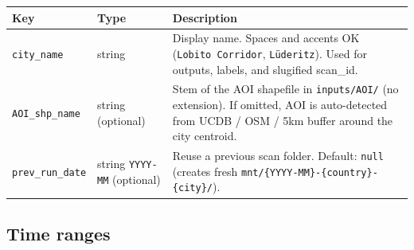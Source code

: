 \documentclass[
  letterpaper,
  DIV=11,
  numbers=noendperiod]{scrreprt}
\newcounter{none} %
\begin{document}
{\def\LTcaptype{none} %
\begin{longtable}[]{@{}
  >{\raggedright\arraybackslash}p{}
  >{\raggedright\arraybackslash}p{}
  >{\raggedright\arraybackslash}p{}@{}}
\toprule\noalign{}
\begin{minipage}[b]{\linewidth}\raggedright
Key
\end{minipage} & \begin{minipage}[b]{\linewidth}\raggedright
Type
\end{minipage} & \begin{minipage}[b]{\linewidth}\raggedright
Description
\end{minipage} \\
\midrule\noalign{}
\endhead
\bottomrule\noalign{}
\endlastfoot
\texttt{city\_name} & string & Display name. Spaces and accents OK
(\texttt{Lobito\ Corridor}, \texttt{Lüderitz}). Used for outputs,
labels, and slugified scan\_id. \\
\texttt{AOI\_shp\_name} & string (optional) & Stem of the AOI shapefile
in \texttt{inputs/AOI/} (no extension). If omitted, AOI is auto-detected
from UCDB / OSM / 5km buffer around the city centroid. \\
\texttt{prev\_run\_date} & string \texttt{YYYY-MM} (optional) & Reuse a
previous scan folder. Default: \texttt{null} (creates fresh
\texttt{mnt/\{YYYY-MM\}-\{country\}-\{city\}/}). \\
\end{longtable}
}

\subsection{Time ranges}\label{time-ranges}
\end{document}
